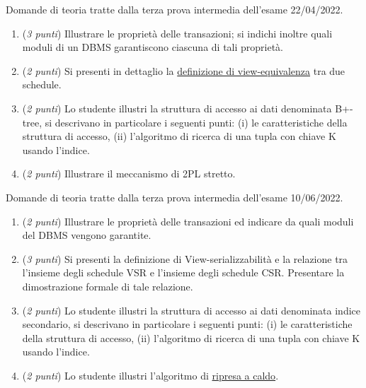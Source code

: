 \documentclass[a4paper]{article}
\begin{document}
	Domande di teoria tratte dalla terza prova intermedia dell'esame 22/04/2022.
	\begin{enumerate}
		\item (\emph{3 punti}) Illustrare le proprietà delle transazioni; si indichi inoltre quali moduli di un DBMS garantiscono ciascuna di tali proprietà.
		
		\item (\emph{2 punti}) Si presenti in dettaglio la \underline{definizione di view-equivalenza} tra due schedule.
		
		\item (\emph{2 punti}) Lo studente illustri la struttura di accesso ai dati denominata B+-tree, si descrivano in particolare i seguenti punti: (i) le caratteristiche della struttura di accesso, (ii) l'algoritmo di ricerca di una tupla con chiave K usando l'indice.
		
		\item (\emph{2 punti}) Illustrare il meccanismo di 2PL stretto.
	\end{enumerate}\newpage
	
	Domande di teoria tratte dalla terza prova intermedia dell'esame 10/06/2022.
	\begin{enumerate}
		\item (\emph{2 punti}) Illustrare le proprietà delle transazioni ed indicare da quali moduli del DBMS vengono garantite.
		
		\item (\emph{3 punti}) Si presenti la definizione di View-serializzabilità e la relazione tra l'insieme degli schedule VSR e l'insieme degli schedule CSR. Presentare la dimostrazione formale di tale relazione.
		
		\item (\emph{2 punti}) Lo studente illustri la struttura di accesso ai dati denominata indice secondario, si descrivano in particolare i seguenti punti: (i) le caratteristiche della struttura di accesso, (ii) l'algoritmo di ricerca di una tupla con chiave K usando l'indice.
		
		\item (\emph{2 punti}) Lo studente illustri l'algoritmo di \underline{ripresa a caldo}.
	\end{enumerate}\newpage
	
	
\end{document}

